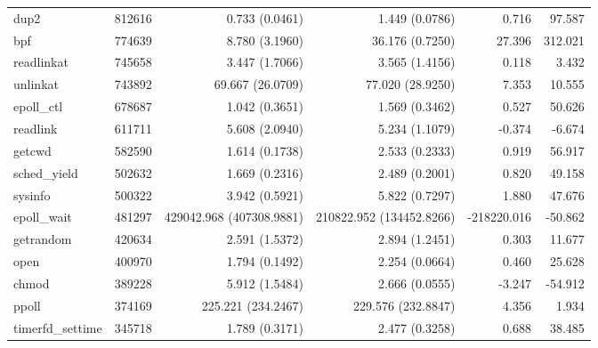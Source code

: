 \begin{longtable}{>{\ttfamily}lrrrrr}
                           dup2 &     812616 &              0.733 (0.0461) &            1.449 (0.0786) &           0.716 &       97.587 \\
                            bpf &     774639 &              8.780 (3.1960) &           36.176 (0.7250) &          27.396 &      312.021 \\
                     readlinkat &     745658 &              3.447 (1.7066) &            3.565 (1.4156) &           0.118 &        3.432 \\
                       unlinkat &     743892 &            69.667 (26.0709) &          77.020 (28.9250) &           7.353 &       10.555 \\
                     epoll\_ctl &     678687 &              1.042 (0.3651) &            1.569 (0.3462) &           0.527 &       50.626 \\
                       readlink &     611711 &              5.608 (2.0940) &            5.234 (1.1079) &          -0.374 &       -6.674 \\
                         getcwd &     582590 &              1.614 (0.1738) &            2.533 (0.2333) &           0.919 &       56.917 \\
                   sched\_yield &     502632 &              1.669 (0.2316) &            2.489 (0.2001) &           0.820 &       49.158 \\
                        sysinfo &     500322 &              3.942 (0.5921) &            5.822 (0.7297) &           1.880 &       47.676 \\
                    epoll\_wait &     481297 &    429042.968 (407308.9881) &  210822.952 (134452.8266) &     -218220.016 &      -50.862 \\
                      getrandom &     420634 &              2.591 (1.5372) &            2.894 (1.2451) &           0.303 &       11.677 \\
                           open &     400970 &              1.794 (0.1492) &            2.254 (0.0664) &           0.460 &       25.628 \\
                          chmod &     389228 &              5.912 (1.5484) &            2.666 (0.0555) &          -3.247 &      -54.912 \\
                          ppoll &     374169 &          225.221 (234.2467) &        229.576 (232.8847) &           4.356 &        1.934 \\
               timerfd\_settime &     345718 &              1.789 (0.3171) &            2.477 (0.3258) &           0.688 &       38.485 \\

\end{longtable}
